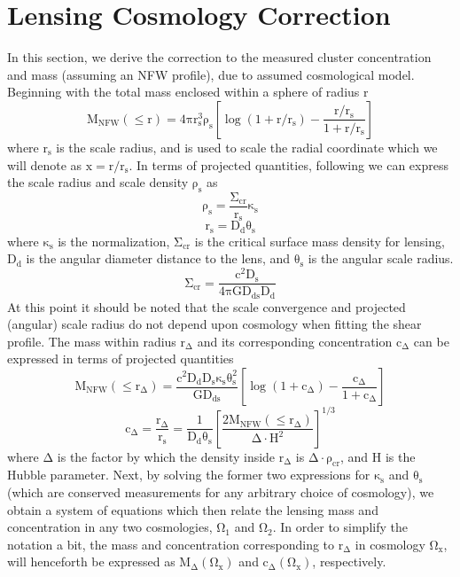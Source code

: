 \chapter{Lensing Cosmology Correction}
In this section, we derive the correction to the measured cluster concentration and
mass (assuming an NFW profile), due to assumed cosmological model. Beginning
with the total mass enclosed within a sphere of radius $\mathrm{r}$
\begin{equation}
\mathrm{M_{NFW}(\le r) = 4\pi r_{s}^{3} \rho_{s} \left[ \log{(1+r/r_{s})} - \frac{r/r_{s}}{1+r/r_{s}} \right]}
\end{equation}
where $\mathrm{r_{s}}$ is the scale radius, and is used to scale the radial
coordinate which we will denote as $\mathrm{x = r/r_{s}}$. In terms of
projected quantities, following \citet{SE10.1} we can express the scale radius
and scale density $\mathrm{\rho_{s}}$ as
\begin{equation}
\mathrm{\rho_{s} = \frac{\Sigma_{cr}}{r_{s}} \kappa_{s}}
\end{equation}
\begin{equation}
\mathrm{r_{s} = D_{d} \theta_{s}}
\end{equation}
where $\mathrm{\kappa_{s}}$ is the normalization, $\mathrm{\Sigma_{cr}}$ is the
critical surface mass density for lensing, $\mathrm{D_{d}}$ is the angular
diameter distance to the lens, and $\mathrm{\theta_{s}}$ is the angular scale
radius.
\begin{equation}
\mathrm{\Sigma_{cr} = \frac{c^{2}D_{s}}{4\pi G D_{ds}D_{d}}}
\end{equation}
At this point it should be noted that the scale convergence and projected
(angular) scale radius do not depend upon cosmology when fitting the shear
profile. The mass within radius $\mathrm{r_{\Delta}}$ and its corresponding
concentration $\mathrm{c_{\Delta}}$ can be expressed in terms of projected
quantities 
\begin{equation}
\mathrm{M_{NFW}(\le r_{\Delta}) = \frac{c^{2}D_{d}D_{s} \kappa_{s}
  \theta_{s}^{2}}{G D_{ds}} \left[ \log{(1+c_{\Delta})} - \frac{c_{\Delta}}{1+c_{\Delta}} \right]}
\end{equation}
\begin{equation}
\mathrm{c_{\Delta} = \frac{r_{\Delta}}{r_{s}} = \frac{1}{D_{d}\theta_{s}} \left[
  \frac{2 M_{NFW}(\le r_{\Delta})}{\Delta \cdot H^{2}} \right]^{1/3}}
\end{equation}
where $\mathrm{\Delta}$ is the factor by which the density inside $\mathrm{r_{\Delta}}$ is
$\mathrm{\Delta \cdot \rho_{cr}}$, and $\mathrm{H}$ is the Hubble
parameter. Next, by solving the former two expressions for
$\mathrm{\kappa_{s}}$ and $\mathrm{\theta_{s}}$ (which are conserved
measurements for any arbitrary choice of cosmology), we obtain a system of
equations which then relate the lensing mass and concentration in any two cosmologies,
$\mathrm{\Omega_{1}}$ and $\mathrm{\Omega_{2}}$. In order to simplify the
notation a bit, the mass and concentration corresponding to $\mathrm{r_{\Delta}}$ 
in cosmology $\mathrm{\Omega_{x}}$, will henceforth be expressed as
$\mathrm{M_{\Delta}(\Omega_{x})}$ and $\mathrm{c_{\Delta}(\Omega_{x})}$,
respectively.

